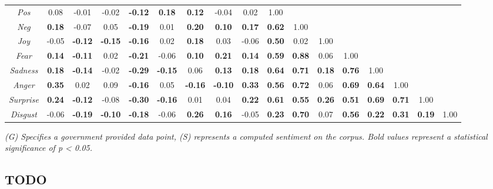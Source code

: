 \begin{landscape}
\begin{table}[]
{\begin{tabular}{@{}|c|cccccccccccccccc|@{}}
\textit{Pos} & 0.08 & -0.01 & -0.02 & \textbf{-0.12} & \textbf{0.18} & \textbf{0.12} & -0.04 & 0.02 & 1.00 & \textbf{} & \textbf{} & \textbf{} & \textbf{} & \textbf{} & \textbf{} & \textbf{} \\
\textit{Neg} & \textbf{0.18} & -0.07 & 0.05 & \textbf{-0.19} & 0.01 & \textbf{0.20} & \textbf{0.10} & \textbf{0.17} & \textbf{0.62} & 1.00 & \textbf{} & \textbf{} & \textbf{} & \textbf{} & \textbf{} & \textbf{} \\
\textit{Joy} & -0.05 & \textbf{-0.12} & \textbf{-0.15} & \textbf{-0.16} & 0.02 & \textbf{0.18} & 0.03 & -0.06 & \textbf{0.50} & 0.02 & 1.00 & \textbf{} & \textbf{} & \textbf{} & \textbf{} & \textbf{} \\
\textit{Fear} & \textbf{0.14} & \textbf{-0.11} & 0.02 & \textbf{-0.21} & -0.06 & \textbf{0.10} & \textbf{0.21} & \textbf{0.14} & \textbf{0.59} & \textbf{0.88} & 0.06 & 1.00 & \textbf{} & \textbf{} & \textbf{} & \textbf{} \\
\textit{Sadness} & \textbf{0.18} & \textbf{-0.14} & -0.02 & \textbf{-0.29} & \textbf{-0.15} & 0.06 & \textbf{0.13} & \textbf{0.18} & \textbf{0.64} & \textbf{0.71} & \textbf{0.18} & \textbf{0.76} & 1.00 & \textbf{} & \textbf{} & \textbf{} \\
\textit{Anger} & \textbf{0.35} & 0.02 & 0.09 & \textbf{-0.16} & 0.05 & \textbf{-0.16} & \textbf{-0.10} & \textbf{0.33} & \textbf{0.56} & \textbf{0.72} & 0.06 & \textbf{0.69} & \textbf{0.64} & 1.00 & \textbf{} & \textbf{} \\
\textit{Surprise} & \textbf{0.24} & \textbf{-0.12} & -0.08 & \textbf{-0.30} & \textbf{-0.16} & 0.01 & 0.04 & \textbf{0.22} & \textbf{0.61} & \textbf{0.55} & \textbf{0.26} & \textbf{0.51} & \textbf{0.69} & \textbf{0.71} & 1.00 & \textbf{} \\
\textit{Disgust} & -0.06 & \textbf{-0.19} & \textbf{-0.10} & \textbf{-0.18} & -0.06 & \textbf{0.26} & \textbf{0.16} & -0.05 & \textbf{0.23} & \textbf{0.70} & 0.07 & \textbf{0.56} & \textbf{0.22} & \textbf{0.31} & \textbf{0.19} & 1.00 \\ \bottomrule
\end{tabular}%
}
\emph{(G) Specifies a government provided data point, (S) represents a computed sentiment on the corpus. Bold values represent a statistical significance of p < 0.05.}
\end{table}
\end{landscape}

\subsection{TODO}
